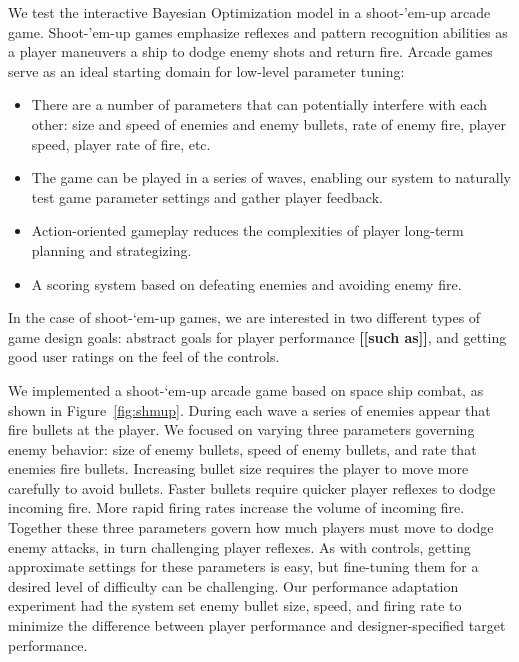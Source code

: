 \documentclass[letterpaper]{article}
\newcommand{\mytodo}[1]{\textbf{[[#1]]}}
\begin{document}
We test the interactive Bayesian Optimization model in a shoot-'em-up arcade game.
Shoot-'em-up games emphasize reflexes and pattern recognition abilities as a player maneuvers a ship to dodge enemy shots and return fire.
%
Arcade games serve as an ideal starting domain for low-level parameter tuning:
\begin{itemize}
\item There are a number of parameters that can potentially interfere with each other: size and speed of enemies and enemy bullets, rate of enemy fire, player speed, player rate of fire, etc.
\item The game can be played in a series of waves, enabling our system to naturally test game parameter settings and gather player feedback.
\item Action-oriented gameplay reduces the complexities of player long-term planning and strategizing.
\item A scoring system based on defeating enemies and avoiding enemy fire.
\end{itemize}
%
%
In the case of shoot-`em-up games, we are interested in two different types of game design goals: abstract goals for player performance \mytodo{such as}, and getting good user ratings on the feel of the controls.

We implemented a shoot-`em-up arcade game based on space ship combat, as shown in Figure~\ref{fig:shmup}.
During each wave a series of enemies appear that fire bullets at the player. 
We focused on varying three parameters governing enemy behavior: size of enemy bullets, speed of enemy bullets, and rate that enemies fire bullets. Increasing bullet size requires the player to move more carefully to avoid bullets. Faster bullets require quicker player reflexes to dodge incoming fire. More rapid firing rates increase the volume of incoming fire. Together these three parameters govern how much players must move to dodge enemy attacks, in turn challenging player reflexes. As with controls, getting approximate settings for these parameters is easy, but fine-tuning them for a desired level of difficulty can be challenging. Our performance adaptation experiment had the system set enemy bullet size, speed, and firing rate to minimize the difference between player performance and designer-specified target performance.
\end{document}
